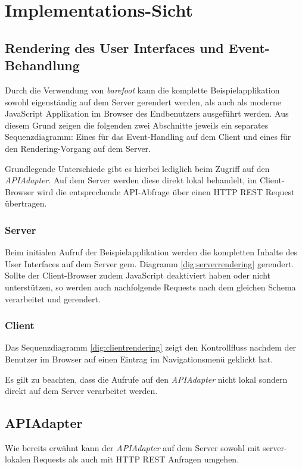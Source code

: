 \section{Implementations-Sicht}
\label{sec:sad-implementation}

\subsection{Rendering des User Interfaces und Event-Behandlung}
Durch die Verwendung von \emph{barefoot} \cite{Barefoot} kann die komplette Beispielapplikation sowohl eigenständig auf dem Server gerendert werden, als auch als moderne JavaScript Applikation im Browser des Endbenutzers ausgeführt werden. Aus diesem Grund zeigen die folgenden zwei Abschnitte jeweils ein separates Sequenzdiagramm: Eines für das Event-Handling auf dem Client und eines für den Rendering-Vorgang auf dem Server.

Grundlegende Unterschiede gibt es hierbei lediglich beim Zugriff auf den \emph{APIAdapter}. Auf dem Server werden diese direkt lokal behandelt, im Client-Browser wird die entsprechende API-Abfrage über einen HTTP \gls{REST} Request übertragen.

\subsubsection*{Server}
Beim initialen Aufruf der Beispielapplikation werden die kompletten Inhalte des User Interfaces auf dem Server gem. Diagramm \ref{dig:serverrendering} gerendert. Sollte der Client-Browser zudem JavaScript deaktiviert haben oder nicht unterstützen, so werden auch nachfolgende Requests nach dem gleichen Schema verarbeitet und gerendert.



\subsubsection*{Client}
Das Sequenzdiagramm \ref{dig:clientrendering} zeigt den Kontrollfluss nachdem der Benutzer im Browser auf einen Eintrag im Navigationsmenü geklickt hat.

Es gilt zu beachten, dass die Aufrufe auf den \emph{APIAdapter} nicht lokal sondern direkt auf dem Server verarbeitet werden.




\subsection{APIAdapter}
Wie bereits erwähnt kann der \emph{APIAdapter} auf dem Server sowohl mit server-lokalen Requests als auch mit HTTP REST Anfragen umgehen.

